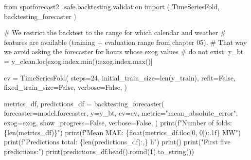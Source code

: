 \documentclass[
  english,
  letterpaper,
]{scrbook}
\newenvironment{Shaded}{\begin{snugshade}}{\end{snugshade}}
\newcommand{\BuiltInTok}[1]{\textcolor[rgb]{0.00,0.23,0.31}{#1}}
\newcommand{\CommentTok}[1]{\textcolor[rgb]{0.37,0.37,0.37}{#1}}
\newcommand{\DecValTok}[1]{\textcolor[rgb]{0.68,0.00,0.00}{#1}}
\newcommand{\ImportTok}[1]{\textcolor[rgb]{0.00,0.46,0.62}{#1}}
\newcommand{\NormalTok}[1]{\textcolor[rgb]{0.00,0.23,0.31}{#1}}
\newcommand{\OperatorTok}[1]{\textcolor[rgb]{0.37,0.37,0.37}{#1}}
\newcommand{\SpecialCharTok}[1]{\textcolor[rgb]{0.37,0.37,0.37}{#1}}
\newcommand{\SpecialStringTok}[1]{\textcolor[rgb]{0.13,0.47,0.30}{#1}}
\newcommand{\StringTok}[1]{\textcolor[rgb]{0.13,0.47,0.30}{#1}}
\newcommand{\VariableTok}[1]{\textcolor[rgb]{0.07,0.07,0.07}{#1}}
\begin{document}
\protect{}\label{run-backtest}
\begin{Shaded}
\begin{Highlighting}[]
\ImportTok{from}\NormalTok{ spotforecast2\_safe.backtesting.validation }\ImportTok{import}\NormalTok{ (}
\NormalTok{    TimeSeriesFold, backtesting\_forecaster}
\NormalTok{)}

\CommentTok{\# We restrict the backtest to the range for which calendar and weather}
\CommentTok{\# features are available (training + evaluation range from chapter 05).}
\CommentTok{\# That way we avoid asking the forecaster for hours whose \textasciigrave{}exog\textasciigrave{} values}
\CommentTok{\# do not exist.}
\NormalTok{y\_bt }\OperatorTok{=}\NormalTok{ y\_clean.loc[exog.index.}\BuiltInTok{min}\NormalTok{():exog.index.}\BuiltInTok{max}\NormalTok{()]}

\NormalTok{cv }\OperatorTok{=}\NormalTok{ TimeSeriesFold(}
\NormalTok{    steps}\OperatorTok{=}\DecValTok{24}\NormalTok{,}
\NormalTok{    initial\_train\_size}\OperatorTok{=}\BuiltInTok{len}\NormalTok{(y\_train),}
\NormalTok{    refit}\OperatorTok{=}\VariableTok{False}\NormalTok{,}
\NormalTok{    fixed\_train\_size}\OperatorTok{=}\VariableTok{False}\NormalTok{,}
\NormalTok{    verbose}\OperatorTok{=}\VariableTok{False}\NormalTok{,}
\NormalTok{)}

\NormalTok{metrics\_df, predictions\_df }\OperatorTok{=}\NormalTok{ backtesting\_forecaster(}
\NormalTok{    forecaster}\OperatorTok{=}\NormalTok{model.forecaster,}
\NormalTok{    y}\OperatorTok{=}\NormalTok{y\_bt,}
\NormalTok{    cv}\OperatorTok{=}\NormalTok{cv,}
\NormalTok{    metric}\OperatorTok{=}\StringTok{"mean\_absolute\_error"}\NormalTok{,}
\NormalTok{    exog}\OperatorTok{=}\NormalTok{exog,}
\NormalTok{    show\_progress}\OperatorTok{=}\VariableTok{False}\NormalTok{,}
\NormalTok{    verbose}\OperatorTok{=}\VariableTok{False}\NormalTok{,}
\NormalTok{)}
\BuiltInTok{print}\NormalTok{(}\SpecialStringTok{f"Number of folds:    }\SpecialCharTok{\{}\BuiltInTok{len}\NormalTok{(metrics\_df)}\SpecialCharTok{\}}\SpecialStringTok{"}\NormalTok{)}
\BuiltInTok{print}\NormalTok{(}\SpecialStringTok{f"Mean MAE:           }\SpecialCharTok{\{}\BuiltInTok{float}\NormalTok{(metrics\_df.iloc[}\DecValTok{0}\NormalTok{, }\DecValTok{0}\NormalTok{])}\SpecialCharTok{:.1f\}}\SpecialStringTok{ MW"}\NormalTok{)}
\BuiltInTok{print}\NormalTok{(}\SpecialStringTok{f"Predictions total:  }\SpecialCharTok{\{}\BuiltInTok{len}\NormalTok{(predictions\_df)}\SpecialCharTok{:,\}}\SpecialStringTok{ h"}\NormalTok{)}
\BuiltInTok{print}\NormalTok{()}
\BuiltInTok{print}\NormalTok{(}\StringTok{"First five predictions:"}\NormalTok{)}
\BuiltInTok{print}\NormalTok{(predictions\_df.head().}\BuiltInTok{round}\NormalTok{(}\DecValTok{1}\NormalTok{).to\_string())}
\end{Highlighting}
\end{Shaded}
\end{document}
